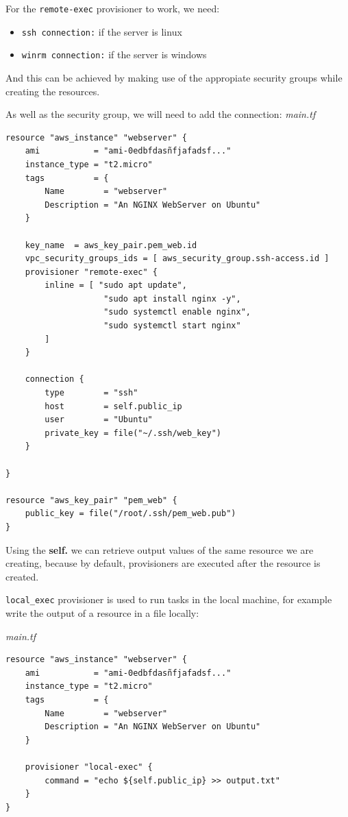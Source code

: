 \documentclass{article}
\newenvironment{blocktemplate}[1]{%
    \tcolorbox[beamer,%
    noparskip,breakable,
    colframe=Blue,%
    colbacklower=LimeGreen!75!LightGreen,%
    title=#1]}%
    {\endtcolorbox}
\newenvironment{blocktemplateIII}[1]{%
    \tcolorbox[beamer,%
    noparskip,breakable,
    ,colframe=Red,%
    colbacklower=LimeGreen!75!LightGreen,%
    title=#1]}%
    {\endtcolorbox}
\newenvironment{codetemplate}[1][]{%
  \mybasecolorbox[#1]
  \itshape
}{%
  \endmybasecolorbox
}
\begin{document}
\begin{blocktemplateIII}{WARNING}
For the \verb|remote-exec| provisioner to work, we need:
\begin{itemize}
    \item \verb|ssh connection:| if the server is linux
    \item \verb|winrm connection:| if the server is windows
\end{itemize}

And this can be achieved by making use of the appropiate security groups while creating the resources.
\end{blocktemplateIII}

As well as the security group, we will need to add the connection:
\begin{codetemplate}{main.tf}
\begin{verbatim}
resource "aws_instance" "webserver" {
    ami           = "ami-0edbfdasñfjafadsf..."
    instance_type = "t2.micro"
    tags          = {
        Name        = "webserver"
        Description = "An NGINX WebServer on Ubuntu"
    }

    key_name  = aws_key_pair.pem_web.id
    vpc_security_groups_ids = [ aws_security_group.ssh-access.id ]
    provisioner "remote-exec" {
        inline = [ "sudo apt update",
                    "sudo apt install nginx -y",
                    "sudo systemctl enable nginx",
                    "sudo systemctl start nginx"
        ]
    }

    connection {
        type        = "ssh"
        host        = self.public_ip
        user        = "Ubuntu"
        private_key = file("~/.ssh/web_key")
    }

}

resource "aws_key_pair" "pem_web" {
    public_key = file("/root/.ssh/pem_web.pub")
}
\end{verbatim}
\end{codetemplate}

\begin{blocktemplate}{Note}
Using the \textbf{self.} we can retrieve output values of the same resource we are creating, because by default, provisioners are executed after the resource is created.
\end{blocktemplate}

\verb|local_exec| provisioner is used to run tasks in the local machine, for example write the output of a resource in a file locally:

\begin{codetemplate}{main.tf}
\begin{verbatim}
resource "aws_instance" "webserver" {
    ami           = "ami-0edbfdasñfjafadsf..."
    instance_type = "t2.micro"
    tags          = {
        Name        = "webserver"
        Description = "An NGINX WebServer on Ubuntu"
    }

    provisioner "local-exec" {
        command = "echo ${self.public_ip} >> output.txt"
    }
}
\end{verbatim}
\end{codetemplate}
\end{document}
